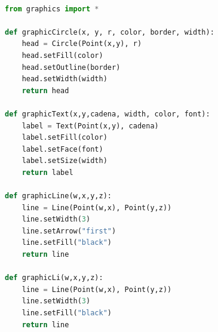 \documentclass{article}
\begin{document}
\begin{lstlisting}[language=Python, caption=Librería que contiene las propiedades de los elementos.]

from graphics import *

def graphicCircle(x, y, r, color, border, width):
    head = Circle(Point(x,y), r)
    head.setFill(color)
    head.setOutline(border)
    head.setWidth(width)
    return head

def graphicText(x,y,cadena, width, color, font):
    label = Text(Point(x,y), cadena)
    label.setFill(color)
    label.setFace(font)
    label.setSize(width)
    return label

def graphicLine(w,x,y,z):
    line = Line(Point(w,x), Point(y,z))
    line.setWidth(3)
    line.setArrow("first")
    line.setFill("black")
    return line

def graphicLi(w,x,y,z):
    line = Line(Point(w,x), Point(y,z))
    line.setWidth(3)
    line.setFill("black")
    return line

\end{lstlisting}
\end{document}
